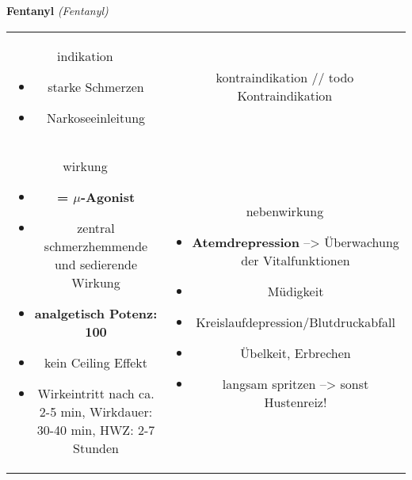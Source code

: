 \begin{frame}{
    \textbf{Fentanyl}
    \textit{(Fentanyl)}
}
    \begin{tabular}{c c}
        \begin{beamercolorbox}[wd=\boxwidth\textwidth,ht=\boxheight\textheight,sep=1em]{indikation}
            \begin{itemize}
                \item starke Schmerzen
                \item Narkoseeinleitung
            \end{itemize}
        \end{beamercolorbox} & 
        \begin{beamercolorbox}[wd=\boxwidth\textwidth,ht=\boxheight\textheight,sep=1em]{kontraindikation}
        // todo Kontraindikation 
        \end{beamercolorbox} \\
        \begin{beamercolorbox}[wd=\boxwidth\textwidth,ht=\boxheight\textheight,sep=1em]{wirkung}
            \begin{itemize}
                \item \textbf{= $\mu$-Agonist}
                \item zentral schmerzhemmende und sedierende Wirkung
                \item \textbf{analgetisch Potenz: 100}
                \item kein Ceiling Effekt
                \item Wirkeintritt nach ca. 2-5 min, Wirkdauer: 30-40 min, HWZ: 2-7 Stunden
            \end{itemize}
        \end{beamercolorbox} & 
        \begin{beamercolorbox}[wd=\boxwidth\textwidth,ht=\boxheight\textheight,sep=1em]{nebenwirkung}
            \begin{itemize}
                \item \textbf{Atemdrepression} --> Überwachung der Vitalfunktionen
                \item Müdigkeit
                \item Kreislaufdepression/Blutdruckabfall
                \item Übelkeit, Erbrechen
                \item langsam spritzen --> sonst Hustenreiz!
            \end{itemize}
        \end{beamercolorbox} \\
    \end{tabular}
\end{frame}

